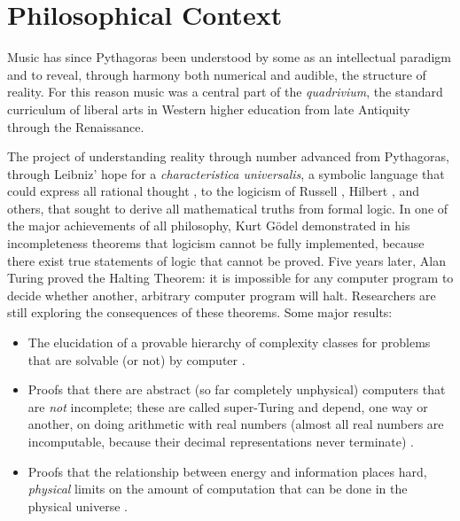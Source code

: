 \documentclass[11pt,papersize=a4]{scrartcl}
\begin{document}
\section*{Philosophical Context}

Music has since Pythagoras \parencite{sep-pythagoras, huffman2014history} been understood by some as an intellectual paradigm and to reveal, through harmony both numerical and audible, the structure of reality. For this reason music was a central part of the \emph{quadrivium}, the standard curriculum of liberal arts in Western higher education from late Antiquity through the Renaissance.

The project of understanding reality through number advanced from Pythagoras, through Leibniz' 
hope for a \emph{characteristica universalis}, a symbolic language that could express all rational thought \parencite{davis2018universal}, to the logicism of Russell \parencite{sep-logicism}, Hilbert \parencite{sep-hilbert-program}, and others, that sought to derive all mathematical truths from formal logic. In one of the major achievements of all philosophy, Kurt Gödel \parencite{godel1986} demonstrated in his incompleteness theorems that logicism cannot be fully implemented, because there exist true statements of logic that cannot  be proved. Five years later, Alan Turing proved the Halting Theorem: it is impossible for any computer program to decide whether another, arbitrary computer program will halt. Researchers are still exploring the consequences of these theorems. Some major results:

\begin{itemize}
\item The elucidation of a provable hierarchy of complexity classes for problems that are solvable (or not) by computer \parencite{arora2009computational}.
\item Proofs that there are abstract (so far completely unphysical) computers that are \emph{not} incomplete; these are called super-Turing and depend, one way or another, on doing arithmetic with real numbers (almost all real numbers are incomputable, because their decimal representations never terminate) \parencite{ord2006many}.
\item Proofs that the relationship between energy and information places hard, \emph{physical} limits on the amount of computation that can be done in the physical universe \parencite{aaronson2005npcomplete, sep-computation-physicalsystems}.
\end{itemize}
\end{document}
